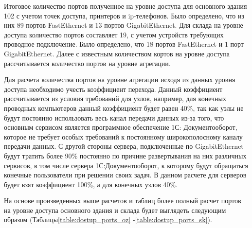 Итоговое количество портов полученное на уровне доступа для основного здания 102 с учетом точек доступа, принтеров и ip-телефонов. Было определено, что из них 89 портов FastEthernet и 13 портов GigabitEthernet. Для склада на уровне доступа количество портов составляет 19, с учетом устройств требующих проводное подключение. Было определено, что 18 портов FastEthernet и 1 порт GigabitEthernet. Далее с известным количеством кортов на уровне доступа рассчитывается количество портов на уровне агрегации.

Для расчета количества портов на уровне агрегации исходя из данных уровня доступа необходимо учесть коэффициент перехода. Данный коэффициент рассчитывается из условия требований для узлов, например, для конечных проводных компьютеров данный коэффициент будет равен 40\%, так как узлы не будут постоянно использовать весь канал передачи данных из-за того, что основным сервисом является программное обеспечение 1С: Документооборот, которое не требует особых требований к постоянному широкополосному каналу передачи данных. С другой стороны сервера, подключенные по GigabitEthernet будут тратить более 90\% постоянно по причине развертывания на них различных сервисов, в том числе сервера 1С:Документооборот, к которому будут обращаться конечные пользователи при решении своих задач. В данном расчете для серверов будет взят коэффициент 100\%, а для конечных узлов 40\%.

%




На основе произведенных выше расчетов и таблиц более полный расчет портов на уровне доступа основного здания и склада будет выглядеть следующим образом (Таблицы\;\ref{table:dostup_ports_oz} -\;\ref{table:dostup_ports_sk}).


